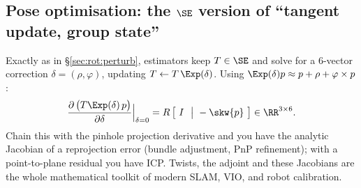 \subsection{Pose optimisation: the $\SE$ version of ``tangent update, group state''}\label{sec:rot:pose-optimisation-version}
Exactly as in \S\ref{sec:rot:perturb}, estimators keep $T\in\SE$ and solve for a 6-vector correction $\delta=(\rho,\varphi)$, updating $T\leftarrow T\,\Exp(\delta)$. Using $\Exp(\delta)p\approx p+\rho+\varphi\times p$:
\[
\frac{\partial\,\big(T\Exp(\delta)\,p\big)}{\partial\delta}\Big|_{\delta=0}=R\,\big[\ I\ \ \big|\ -\skw{p}\ \big]\in\RR^{3\times6}.
\]
Chain this with the pinhole projection derivative and you have the analytic Jacobian of a reprojection error (bundle adjustment, PnP refinement); with a point-to-plane residual you have ICP. Twists, the adjoint and these Jacobians are the whole mathematical toolkit of modern SLAM, VIO, and robot calibration.
